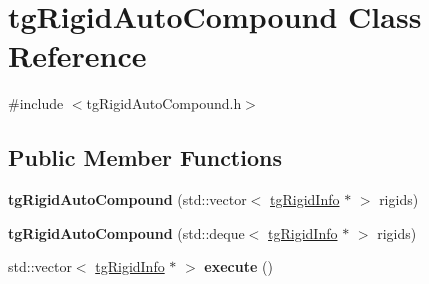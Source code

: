 \hypertarget{classtg_rigid_auto_compound}{\section{tg\-Rigid\-Auto\-Compound Class Reference}
\label{classtg_rigid_auto_compound}
}


{\ttfamily \#include $<$tg\-Rigid\-Auto\-Compound.\-h$>$}

\subsection*{Public Member Functions}
\begin{DoxyCompactItemize}
\item 
\hypertarget{classtg_rigid_auto_compound_a524a5465dbdae0be9fe778e2163742e0}{{\bfseries tg\-Rigid\-Auto\-Compound} (std\-::vector$<$ \hyperlink{classtg_rigid_info}{tg\-Rigid\-Info} $\ast$ $>$ rigids)}\label{classtg_rigid_auto_compound_a524a5465dbdae0be9fe778e2163742e0}

\item 
\hypertarget{classtg_rigid_auto_compound_ad1c48fbf27cadd20fb13fc317a6572f5}{{\bfseries tg\-Rigid\-Auto\-Compound} (std\-::deque$<$ \hyperlink{classtg_rigid_info}{tg\-Rigid\-Info} $\ast$ $>$ rigids)}\label{classtg_rigid_auto_compound_ad1c48fbf27cadd20fb13fc317a6572f5}

\item 
\hypertarget{classtg_rigid_auto_compound_a828b3cefd5f79433c5cb5887896da0f6}{std\-::vector$<$ \hyperlink{classtg_rigid_info}{tg\-Rigid\-Info} $\ast$ $>$ {\bfseries execute} ()}\label{classtg_rigid_auto_compound_a828b3cefd5f79433c5cb5887896da0f6}

\end{DoxyCompactItemize}
